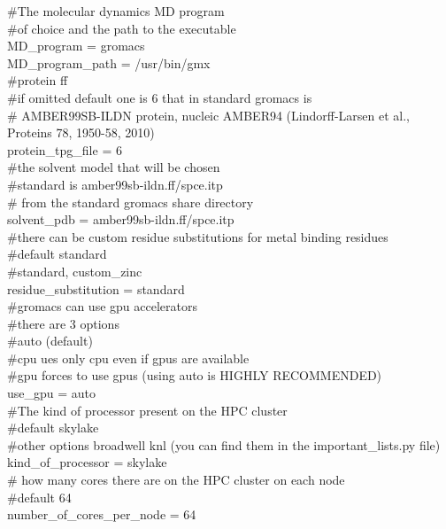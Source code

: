 {					\#The molecular dynamics MD program\\
					\#of choice and the path to the executable\\
					$\ $\\
					MD\_program = gromacs\\
					MD\_program\_path = /usr/bin/gmx\\
					$\ $\\
					\#protein ff\\
					\#if omitted default one is 6 that in standard gromacs is\\
					\# AMBER99SB-ILDN protein, nucleic AMBER94 (Lindorff-Larsen et al., Proteins 78, 1950-58, 2010)\\
					protein\_tpg\_file = 6\\
					$\ $\\
					\#the solvent model that will be chosen\\
					\#standard is amber99sb-ildn.ff/spce.itp\\
					\# from the standard gromacs share directory\\
					solvent\_pdb = amber99sb-ildn.ff/spce.itp\\
					$\ $\\
					\#there can be custom residue substitutions for metal binding residues\\
					\#default standard\\
					\#standard, custom\_zinc\\
					residue\_substitution = standard\\
					$\ $\\
					\#gromacs can use gpu accelerators\\
					\#there are 3 options\\
					\#auto (default)\\
					\#cpu ues only cpu even if gpus are available\\
					\#gpu forces to use gpus (using auto is HIGHLY RECOMMENDED)\\
					use\_gpu = auto
					$\ $\\
					\#The kind of processor present on the HPC cluster\\
					\#default skylake\\
					\#other options broadwell knl (you can find them in the important\_lists.py file)\\
					kind\_of\_processor = skylake\\
					$\ $\\
					\# how many cores there are on the HPC cluster on each node\\
					\#default 64\\
					number\_of\_cores\_per\_node = 64}
				
